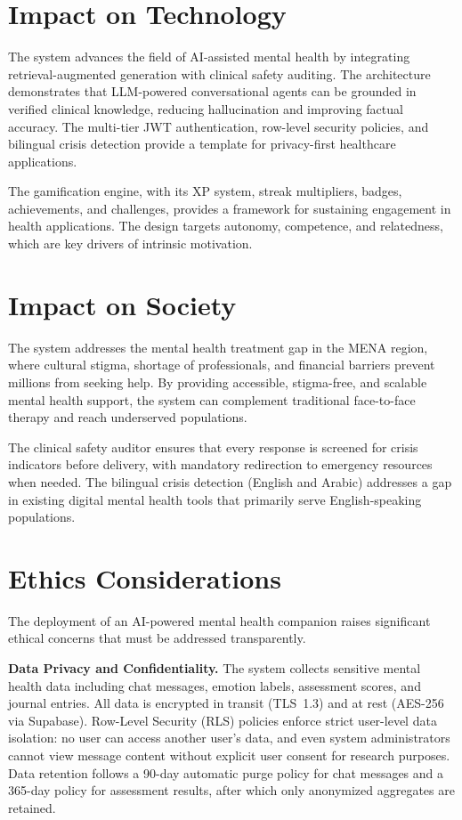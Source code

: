 \documentclass[12pt,a4paper,oneside,openany]{report}
\begin{document}
\section{Impact on Technology}

The system advances the field of AI-assisted mental health by integrating retrieval-augmented generation with clinical safety auditing. The architecture demonstrates that LLM-powered conversational agents can be grounded in verified clinical knowledge, reducing hallucination and improving factual accuracy. The multi-tier JWT authentication, row-level security policies, and bilingual crisis detection provide a template for privacy-first healthcare applications.

The gamification engine, with its XP system, streak multipliers, badges, achievements, and challenges, provides a framework for sustaining engagement in health applications. The design targets autonomy, competence, and relatedness, which are key drivers of intrinsic motivation.

\section{Impact on Society}

The system addresses the mental health treatment gap in the MENA region, where cultural stigma, shortage of professionals, and financial barriers prevent millions from seeking help. By providing accessible, stigma-free, and scalable mental health support, the system can complement traditional face-to-face therapy and reach underserved populations.

The clinical safety auditor ensures that every response is screened for crisis indicators before delivery, with mandatory redirection to emergency resources when needed. The bilingual crisis detection (English and Arabic) addresses a gap in existing digital mental health tools that primarily serve English-speaking populations.

\section{Ethics Considerations}

The deployment of an AI-powered mental health companion raises significant ethical concerns that must be addressed transparently.

\textbf{Data Privacy and Confidentiality.} The system collects sensitive mental health data including chat messages, emotion labels, assessment scores, and journal entries. All data is encrypted in transit (TLS~1.3) and at rest (AES-256 via Supabase). Row-Level Security (RLS) policies enforce strict user-level data isolation: no user can access another user's data, and even system administrators cannot view message content without explicit user consent for research purposes. Data retention follows a 90-day automatic purge policy for chat messages and a 365-day policy for assessment results, after which only anonymized aggregates are retained.
\end{document}
